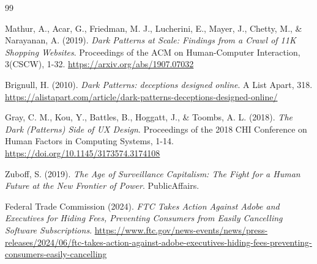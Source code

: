 \documentclass[12pt,a4paper]{article}
\begin{document}
\newpage
\begin{thebibliography}{99}

Mathur, A., Acar, G., Friedman, M. J., Lucherini, E., Mayer, J., Chetty, M., \& Narayanan, A. (2019).
\emph{Dark Patterns at Scale: Findings from a Crawl of 11K Shopping Websites}.
Proceedings of the ACM on Human-Computer Interaction, 3(CSCW), 1-32.
\url{https://arxiv.org/abs/1907.07032}

Brignull, H. (2010).
\emph{Dark Patterns: deceptions designed online}.
A List Apart, 318.
\url{https://alistapart.com/article/dark-patterns-deceptions-designed-online/}

Gray, C. M., Kou, Y., Battles, B., Hoggatt, J., \& Toombs, A. L. (2018).
\emph{The Dark (Patterns) Side of UX Design}.
Proceedings of the 2018 CHI Conference on Human Factors in Computing Systems, 1-14.
\url{https://doi.org/10.1145/3173574.3174108}

Zuboff, S. (2019).
\emph{The Age of Surveillance Capitalism: The Fight for a Human Future at the New Frontier of Power}.
PublicAffairs.

Federal Trade Commission (2024).
\emph{FTC Takes Action Against Adobe and Executives for Hiding Fees, Preventing Consumers from Easily Cancelling Software Subscriptions}.
\url{https://www.ftc.gov/news-events/news/press-releases/2024/06/ftc-takes-action-against-adobe-executives-hiding-fees-preventing-consumers-easily-cancelling}

\end{thebibliography}
\end{document}

